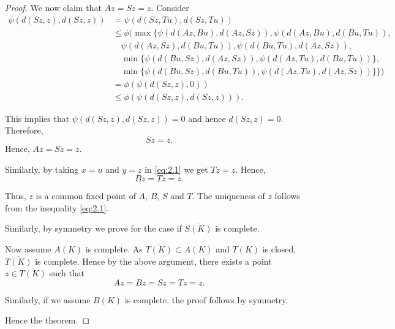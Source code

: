 \documentclass[10pt,a4paper]{amsart}
\begin{document}
\begin{proof}
We now claim that $Az = Sz = z$. Consider
\begin{align*}
\psi(d(Sz,z),d(Sz,z)) &= \psi(d(Sz,Tu),d(Sz,Tu)) \\
&\leq \phi(\max\{\psi(d(Az,Bu),d(Az,Sz)), \psi(d(Az,Bu),d(Bu,Tu)), \\
&\quad \psi(d(Az,Sz),d(Bu,Tu)), \psi(d(Bu,Tu),d(Az,Sz)), \\
&\quad \min\{\psi(d(Bu,Sz),d(Az,Sz)), \psi(d(Az,Tu),d(Bu,Tu))\}, \\
&\quad \min\{\psi(d(Bu,Sz),d(Bu,Tu)), \psi(d(Az,Tu),d(Az,Sz))\}\}) \\
&= \phi(\psi(d(Sz,z),0)) \\
&\leq \phi(\psi(d(Sz,z),d(Sz,z))).
\end{align*}

This implies that $\psi(d(Sz,z),d(Sz,z)) = 0$ and hence $d(Sz,z) = 0$. Therefore,
\[
Sz = z.
\]
Hence, $Az = Sz = z$.

Similarly, by taking $x = u$ and $y = z$ in \eqref{eq:2.1} we get $Tz = z$. Hence,
\[
Bz = Tz = z.
\]

Thus, $z$ is a common fixed point of $A$, $B$, $S$ and $T$. The uniqueness of $z$ follows from the inequality \eqref{eq:2.1}.

Similarly, by symmetry we prove for the case if $\overline{S(K)}$ is complete.

Now assume $A(K)$ is complete. As $\overline{T(K)} \subset A(K)$ and $\overline{T(K)}$ is closed, $\overline{T(K)}$ is complete. Hence by the above argument, there exists a point $z \in \overline{T(K)}$ such that
\[
Az = Bz = Sz = Tz = z.
\]

Similarly, if we assume $B(K)$ is complete, the proof follows by symmetry.

Hence the theorem.
\end{proof}
\end{document}
